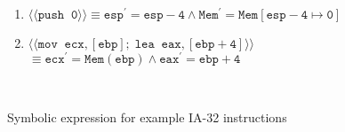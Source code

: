 \begin{figure}[t]
\begin{center}\vspace{-1mm}
\small
\begin{enumerate}
 \item $\mathtt{\langle\!\langle push \;\; 0\rangle\!\rangle\equiv esp^\prime=esp-4 \wedge Mem^\prime = Mem[esp-4\mapsto 0]}$
  \item $\mathtt{\langle\!\langle  mov \;\; ecx, [ebp];\; lea \;\; eax, [ebp+4]\rangle\!\rangle}$ $\mathtt{\equiv ecx^\prime = Mem(ebp) \wedge eax^\prime = ebp + 4} $
\end{enumerate}
~\\
\vspace{-4mm}
\caption{Symbolic expression for example IA-32 instructions }
\label{fig:example-qfbv}
\vspace{-2mm}
\end{center}
\end{figure}



